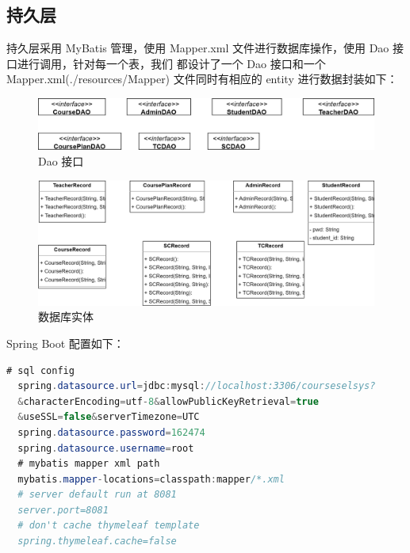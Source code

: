 \documentclass[12pt, a4paper]{article}
\begin{document}
\subsection{持久层}
持久层采用 MyBatis 管理，使用 Mapper.xml 文件进行数据库操作，使用 Dao 接口进行调用，针对每一个表，我们
都设计了一个 Dao 接口和一个 Mapper.xml(./resources/Mapper) 文件同时有相应的 entity 进行数据封装如下：
\begin{figure}[H]
	\centering
	\includegraphics[width = 0.8 \textwidth]{MapperInterface.png}
	\caption{Dao 接口}
\end{figure}
\begin{figure}[H]
	\centering
	\includegraphics[width = 0.9 \textwidth]{entity.png}
	\caption{数据库实体}
\end{figure}

Spring Boot 配置如下：
\begin{lstlisting}[language = Java]
  # sql config
  spring.datasource.url=jdbc:mysql://localhost:3306/courseselsys?
  &characterEncoding=utf-8&allowPublicKeyRetrieval=true
  &useSSL=false&serverTimezone=UTC
  spring.datasource.password=162474
  spring.datasource.username=root
  # mybatis mapper xml path
  mybatis.mapper-locations=classpath:mapper/*.xml
  # server default run at 8081
  server.port=8081
  # don't cache thymeleaf template
  spring.thymeleaf.cache=false
\end{lstlisting}
\end{document}
